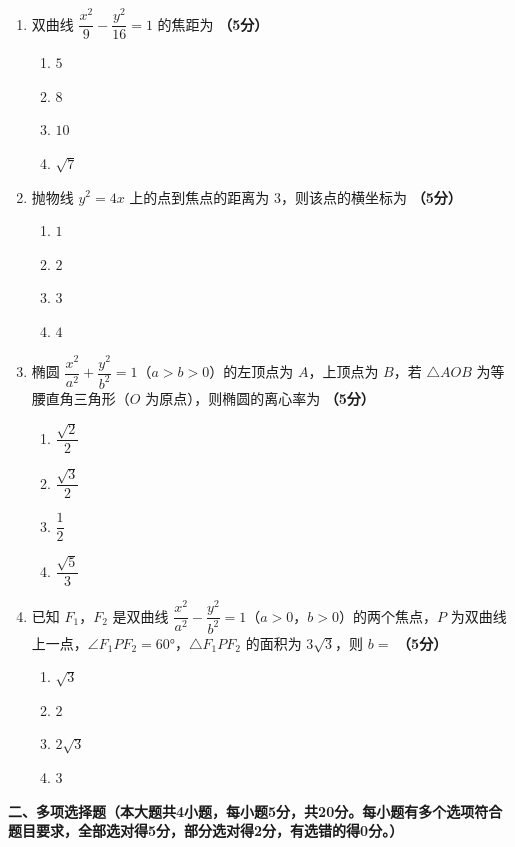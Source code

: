 \documentclass[12pt, a4paper]{ctexart}
\newcommand{\score}[1]{\hfill\textbf{（#1分）}}
\begin{document}
\begin{enumerate}
\item 双曲线 $\dfrac{x^2}{9}-\dfrac{y^2}{16}=1$ 的焦距为 \score{5}
\begin{enumerate}[label=\Alph*.]
\item $5$
\item $8$
\item $10$
\item $\sqrt{7}$
\end{enumerate}

\item 抛物线 $y^2=4x$ 上的点到焦点的距离为 $3$，则该点的横坐标为 \score{5}
\begin{enumerate}[label=\Alph*.]
\item $1$
\item $2$
\item $3$
\item $4$
\end{enumerate}

\item 椭圆 $\dfrac{x^2}{a^2}+\dfrac{y^2}{b^2}=1$（$a>b>0$）的左顶点为 $A$，上顶点为 $B$，若 $\triangle AOB$ 为等腰直角三角形（$O$ 为原点），则椭圆的离心率为 \score{5}
\begin{enumerate}[label=\Alph*.]
\item $\dfrac{\sqrt{2}}{2}$
\item $\dfrac{\sqrt{3}}{2}$
\item $\dfrac{1}{2}$
\item $\dfrac{\sqrt{5}}{3}$
\end{enumerate}

\item 已知 $F_1$，$F_2$ 是双曲线 $\dfrac{x^2}{a^2}-\dfrac{y^2}{b^2}=1$（$a>0$，$b>0$）的两个焦点，$P$ 为双曲线上一点，$\angle F_1PF_2=60°$，$\triangle F_1PF_2$ 的面积为 $3\sqrt{3}$，则 $b=$ \score{5}
\begin{enumerate}[label=\Alph*.]
\item $\sqrt{3}$
\item $2$
\item $2\sqrt{3}$
\item $3$
\end{enumerate}
\end{enumerate}

\vspace{1em}

\noindent\textbf{二、多项选择题（本大题共4小题，每小题5分，共20分。每小题有多个选项符合题目要求，全部选对得5分，部分选对得2分，有选错的得0分。）}

\vspace{0.5em}
\end{document}
